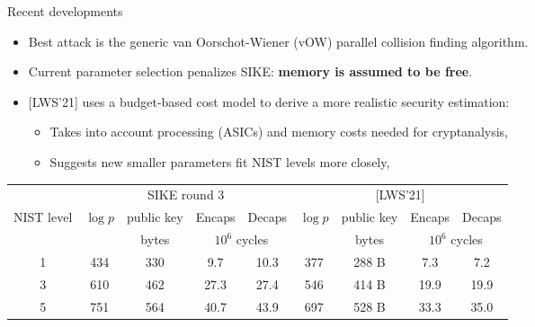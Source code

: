 \documentclass[aspectratio=169]{beamer}
\begin{document}
\begin{frame}{Recent developments}
  \vfill
  \begin{itemize}
  \item Best attack is the generic van Oorschot-Wiener (vOW) parallel
    collision finding algorithm.
  \item Current parameter selection penalizes SIKE: \textbf{memory is
      assumed to be free}.
  \item {[LWS'21]} uses a budget-based cost model to derive a more
    realistic security estimation:
    \begin{itemize}
    \item Takes into account processing (ASICs) and memory costs
      needed for cryptanalysis,
    \item Suggests new smaller parameters fit NIST levels more closely,
    \end{itemize}
  \end{itemize}

  \begin{center}
    \begin{tabular}{c | c c c c | c c c c }
      \hline
      & \multicolumn{4}{c|}{SIKE round 3} & \multicolumn{4}{c}{[LWS'21]} \\
      NIST level & $\log p$ & public key & Encaps & Decaps & $\log p$ & public key & Encaps & Decaps \\
      && \small bytes &\multicolumn{2}{c|}{\small $10^6$ cycles} && \small bytes & \multicolumn{2}{c}{\small $10^6$ cycles} \\
      \hline\hline
      1 & 434 & 330 & 9.7 & 10.3 & 377 & 288 B & \phantom{0}7.3 & \phantom{0}7.2\\
      3 & 610 & 462 & 27.3 & 27.4 & 546 & 414 B & 19.9 & 19.9\\
      5 & 751 & 564 & 40.7 & 43.9 & 697 & 528 B & 33.3 & 35.0\\
      \hline
    \end{tabular}
  \end{center}
  
\end{frame}

\end{document}
